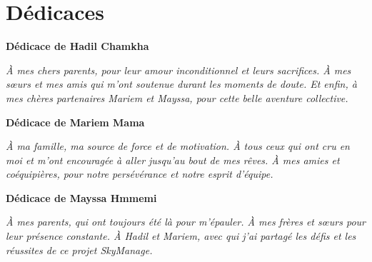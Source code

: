 \chapter*{Dédicaces}
\thispagestyle{empty}

\begin{flushleft}
    \textbf{Dédicace de Hadil Chamkha}
\end{flushleft}
\textit{À mes chers parents, pour leur amour inconditionnel et leurs sacrifices. À mes sœurs et mes amis qui m'ont soutenue durant les moments de doute. Et enfin, à mes chères partenaires Mariem et Mayssa, pour cette belle aventure collective.}

\vspace{1.5cm}

\begin{flushleft}
    \textbf{Dédicace de Mariem Mama}
\end{flushleft}
\textit{À ma famille, ma source de force et de motivation. À tous ceux qui ont cru en moi et m'ont encouragée à aller jusqu'au bout de mes rêves. À mes amies et coéquipières, pour notre persévérance et notre esprit d'équipe.}

\vspace{1.5cm}

\begin{flushleft}
    \textbf{Dédicace de Mayssa Hmmemi}
\end{flushleft}
\textit{À mes parents, qui ont toujours été là pour m'épauler. À mes frères et sœurs pour leur présence constante. À Hadil et Mariem, avec qui j'ai partagé les défis et les réussites de ce projet SkyManage.}

\vfill
\newpage